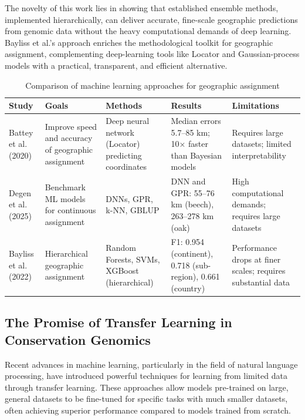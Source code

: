 \documentclass[twocolumn,10pt]{article}
\begin{document}
The novelty of this work lies in showing that established ensemble methods, implemented
hierarchically, can deliver accurate, fine-scale geographic predictions from genomic data without
the heavy computational demands of deep learning. Bayliss et al.'s approach enriches the
methodological toolkit for geographic assignment, complementing deep-learning tools like Locator and
Gaussian-process models with a practical, transparent, and efficient alternative.

\begin{table}[t]
\centering
\caption{Comparison of machine learning approaches for geographic assignment}
\label{tab:ml_methods_comparison}
\small
\begin{tabular}{p{2.5cm}p{2.5cm}p{2.5cm}p{2.5cm}p{2.5cm}}
\hline
\textbf{Study} & \textbf{Goals} & \textbf{Methods} & \textbf{Results} & \textbf{Limitations} \\
\hline
Battey et al. (2020)
  & Improve speed and accuracy of geographic assignment
  & Deep neural network (Locator) predicting coordinates
  & Median errors 5.7–85 km; 10× faster than Bayesian models
  & Requires large datasets; limited interpretability \\
\hline
Degen et al. (2025)
  & Benchmark ML models for continuous assignment
  & DNNs, GPR, k-NN, GBLUP
  & DNN and GPR: 55–76 km (beech), 263–278 km (oak)
  & High computational demands; requires large datasets \\
\hline
Bayliss et al. (2022)
  & Hierarchical geographic assignment
  & Random Forests, SVMs, XGBoost (hierarchical)
  & F1: 0.954 (continent), 0.718 (sub-region), 0.661 (country)
  & Performance drops at finer scales; requires substantial data \\
\hline

\end{tabular}
\end{table}

\subsection*{The Promise of Transfer Learning in Conservation Genomics}

Recent advances in machine learning, particularly in the field of natural language processing, have
introduced powerful techniques for learning from limited data through transfer learning. These
approaches allow models pre-trained on large, general datasets to be fine-tuned for specific tasks
with much smaller datasets, often achieving superior performance compared to models trained from
scratch.
\end{document}
